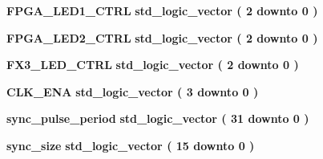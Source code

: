 \begin{DoxyCompactItemize}
\item 
{\bf F\+P\+G\+A\+\_\+\+L\+E\+D1\+\_\+\+C\+T\+RL} {\bfseries {\bfseries \textcolor{comment}{std\+\_\+logic\+\_\+vector}\textcolor{vhdlchar}{ }\textcolor{vhdlchar}{(}\textcolor{vhdlchar}{ }\textcolor{vhdlchar}{ } \textcolor{vhdldigit}{2} \textcolor{vhdlchar}{ }\textcolor{keywordflow}{downto}\textcolor{vhdlchar}{ }\textcolor{vhdlchar}{ } \textcolor{vhdldigit}{0} \textcolor{vhdlchar}{ }\textcolor{vhdlchar}{)}\textcolor{vhdlchar}{ }}} 
\item 
{\bf F\+P\+G\+A\+\_\+\+L\+E\+D2\+\_\+\+C\+T\+RL} {\bfseries {\bfseries \textcolor{comment}{std\+\_\+logic\+\_\+vector}\textcolor{vhdlchar}{ }\textcolor{vhdlchar}{(}\textcolor{vhdlchar}{ }\textcolor{vhdlchar}{ } \textcolor{vhdldigit}{2} \textcolor{vhdlchar}{ }\textcolor{keywordflow}{downto}\textcolor{vhdlchar}{ }\textcolor{vhdlchar}{ } \textcolor{vhdldigit}{0} \textcolor{vhdlchar}{ }\textcolor{vhdlchar}{)}\textcolor{vhdlchar}{ }}} 
\item 
{\bf F\+X3\+\_\+\+L\+E\+D\+\_\+\+C\+T\+RL} {\bfseries {\bfseries \textcolor{comment}{std\+\_\+logic\+\_\+vector}\textcolor{vhdlchar}{ }\textcolor{vhdlchar}{(}\textcolor{vhdlchar}{ }\textcolor{vhdlchar}{ } \textcolor{vhdldigit}{2} \textcolor{vhdlchar}{ }\textcolor{keywordflow}{downto}\textcolor{vhdlchar}{ }\textcolor{vhdlchar}{ } \textcolor{vhdldigit}{0} \textcolor{vhdlchar}{ }\textcolor{vhdlchar}{)}\textcolor{vhdlchar}{ }}} 
\item 
{\bf C\+L\+K\+\_\+\+E\+NA} {\bfseries {\bfseries \textcolor{comment}{std\+\_\+logic\+\_\+vector}\textcolor{vhdlchar}{ }\textcolor{vhdlchar}{(}\textcolor{vhdlchar}{ }\textcolor{vhdlchar}{ } \textcolor{vhdldigit}{3} \textcolor{vhdlchar}{ }\textcolor{keywordflow}{downto}\textcolor{vhdlchar}{ }\textcolor{vhdlchar}{ } \textcolor{vhdldigit}{0} \textcolor{vhdlchar}{ }\textcolor{vhdlchar}{)}\textcolor{vhdlchar}{ }}} 
\item 
{\bf sync\+\_\+pulse\+\_\+period} {\bfseries {\bfseries \textcolor{comment}{std\+\_\+logic\+\_\+vector}\textcolor{vhdlchar}{ }\textcolor{vhdlchar}{(}\textcolor{vhdlchar}{ }\textcolor{vhdlchar}{ } \textcolor{vhdldigit}{31} \textcolor{vhdlchar}{ }\textcolor{keywordflow}{downto}\textcolor{vhdlchar}{ }\textcolor{vhdlchar}{ } \textcolor{vhdldigit}{0} \textcolor{vhdlchar}{ }\textcolor{vhdlchar}{)}\textcolor{vhdlchar}{ }}} 
\item 
{\bf sync\+\_\+size} {\bfseries {\bfseries \textcolor{comment}{std\+\_\+logic\+\_\+vector}\textcolor{vhdlchar}{ }\textcolor{vhdlchar}{(}\textcolor{vhdlchar}{ }\textcolor{vhdlchar}{ } \textcolor{vhdldigit}{15} \textcolor{vhdlchar}{ }\textcolor{keywordflow}{downto}\textcolor{vhdlchar}{ }\textcolor{vhdlchar}{ } \textcolor{vhdldigit}{0} \textcolor{vhdlchar}{ }\textcolor{vhdlchar}{)}\textcolor{vhdlchar}{ }}} 

\end{DoxyCompactItemize}
